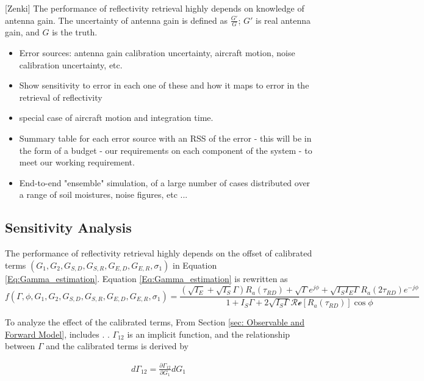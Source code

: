 \documentclass[draftcls,onecolumn]{IEEEtran}  %
\begin{document}
[Zenki]
The performance of reflectivity retrieval highly depends on knowledge of antenna gain. The uncertainty of antenna gain is defined as $\frac{G'}{G}$; $G'$ is real antenna gain, and $G$ is the truth.  


\label{sec:error}
   \begin{itemize}
     \item Error sources: antenna gain calibration uncertainty, aircraft motion, noise calibration uncertainty, etc.
     \item Show sensitivity to error in each one of these and how it maps to error in the retrieval of reflectivity
     \item special case of aircraft motion and integration time.
     \item Summary table for each error source with an RSS of the error - this will be in the form of a budget - our requirements on each component of the system - to meet our working requirement.
     \item End-to-end "ensemble" simulation, of a large number of cases distributed over a range of soil moistures, noise figures, etc ...
   \end{itemize}
   
\subsection{Sensitivity Analysis}
The performance of reflectivity retrieval highly depends on the offset of calibrated terms $(G_1, G_2, G_{S,D}, G_{S,R}, G_{E,D}, G_{E,R}, \sigma_1)$ in Equation \ref{Eq:Gamma_estimation}. Equation \ref{Eq:Gamma_estimation} is rewritten as
\begin{equation}
f(\Gamma, \phi, G_1, G_2, G_{S,D}, G_{S,R}, G_{E,D}, G_{E,R}, \sigma_1) =
	\frac{(\sqrt{I_E}+\sqrt{I_S}\Gamma)R_a(\tau_{RD})+\sqrt{\Gamma} 
    e^{j\phi}+\sqrt{I_S I_E\Gamma} R_a(2\tau_{RD})e^{-j\phi}} 
    {1 + I_S \Gamma + 2 \sqrt{I_S \Gamma} \mathcal{Re}[ R_a(\tau_{RD})] \cos \phi}
        \label{Eq:Gamma_uncertainty}
\end{equation}

To analyze the effect of the calibrated terms,  
From Section \ref{sec: Observable and Forward Model},  includes  . . $\Gamma_{12}$ is an implicit function, and the relationship between $\Gamma$ and the calibrated terms is derived by

\begin{eqnarray}
d\Gamma_{12} = \frac{\partial \Gamma_{12}}{\partial G_1} dG_1 
\end{eqnarray}
\end{document}
